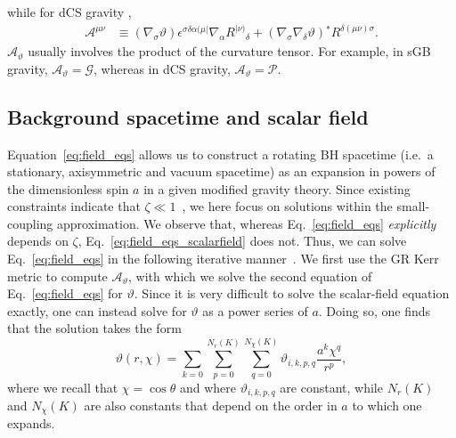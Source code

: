 \documentclass[aps,prx,amsmath,floats,floatfix,twocolumn,
  superscriptaddress,nofootinbib,showpacs]{revtex4-1}
\begin{document}
while for dCS gravity \cite{dCS_01, dCS_02, dCS_03, QNM_dCS_01, QNM_dCS_02, QNM_dCS_03, QNM_dCS_04}, 
\begin{align}\label{eq:Amunu_dCS}
\mathscr{A}^{\mu \nu} & \equiv \left(\nabla_\sigma \vartheta \right) \epsilon^{\sigma \delta \alpha(\mu|} \nabla_\alpha R^{|\nu)}{}_{\delta} + \left(\nabla_\sigma \nabla_\delta \vartheta\right) {}^* R^{\delta (\mu \nu) \sigma}. 
\end{align}
$\mathscr{A}_{\vartheta}$ usually involves the product of the curvature tensor. 
For example, in sGB gravity, $\mathscr{A}_{\vartheta} = \mathscr{G}$, whereas in dCS gravity, $\mathscr{A}_{\vartheta} = \mathscr{P}$. 

\subsection{Background spacetime and scalar field}
\label{sec:bkgd}

Equation~\eqref{eq:field_eqs} allows us to construct a rotating BH spacetime (i.e.~a stationary, axisymmetric and vacuum spacetime) as an expansion in powers of the dimensionless spin $a$ in a given modified gravity theory. 
Since existing constraints indicate that $\zeta \ll 1 $~\cite{Nair:2019iur, Perkins:2021mhb}, we here focus on solutions within the small-coupling approximation.
We observe that, whereas Eq.~\eqref{eq:field_eqs} \textit{explicitly} depends on $\zeta$, Eq.~\eqref{eq:field_eqs_scalarfield} does not. 
Thus, we can solve Eq.~\eqref{eq:field_eqs} in the following iterative manner~\cite{Yunes:2009hc, Yagi:2012ya, Pani:2009wy, Ayzenberg:2014aka, Maselli:2015tta, McNees:2015srl, Cano_Ruiperez_2019}.
We first use the GR Kerr metric to compute $\mathscr{A}_{\vartheta}$, with which we solve the second equation of Eq.~\eqref{eq:field_eqs} for $\vartheta$. 
Since it is very difficult to solve the scalar-field equation exactly, one can instead solve for $\vartheta$ as a power series of $a$. Doing so, one finds that the solution takes the form~\cite{Yunes:2009hc,Yagi:2012ya,Cano_Ruiperez_2019} 
\begin{equation}\label{eq:vartheta_fns}
\vartheta (r, \chi) = \sum_{k=0}^{} \sum_{p=0}^{N_{r}(K)} \sum_{q=0}^{N_{\chi}(K)} \vartheta_{i, k, p, q} \frac{a^{k} \chi^{q} }{r^p}, 
\end{equation}
where we recall that $\chi = \cos{\theta}$ and where ${\vartheta}_{i, k, p, q}$ are constant, while $N_{r}(K)$ and $N_{\chi}(K)$ are also constants that depend on the order in $a$ to which one expands. 
\end{document}
